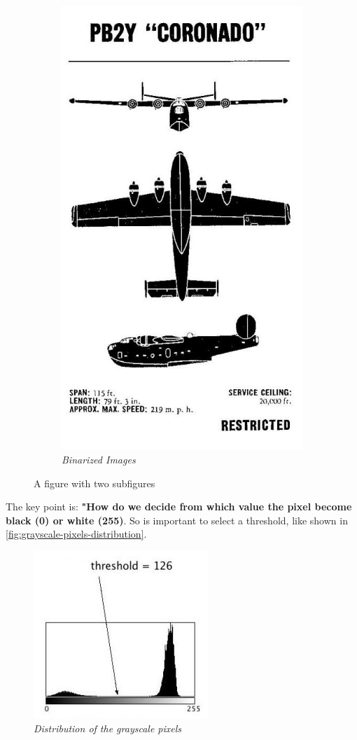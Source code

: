\documentclass[paper=a4, fontsize=10pt]{scrartcl}	%
\begin{document}
\begin{figure}[H]
\begin{subfigure}{.5\textwidth}
			\includegraphics[width=0.8\linewidth]{images/binarization/binarized.jpeg}
			\caption{\textit{Binarized Images}}
			\label{fig:binarized}
		\end{subfigure}
		\caption{A figure with two subfigures}
		\label{fig:test}
	\end{figure}

	The key point is: \textbf{"How do we decide from which value the pixel become black (0) or white (255)}. So is important to select a threshold, like shown in \autoref{fig:grayscale-pixels-distribution}.

	\begin{figure}[H]
		\centering
		\includegraphics[width=0.45\linewidth]{images/binarization/histogram.jpeg}
		\caption{\textit{Distribution of the grayscale pixels}}
		\label{fig:grayscale-pixels-distribution}
	\end{figure}
\end{document}
